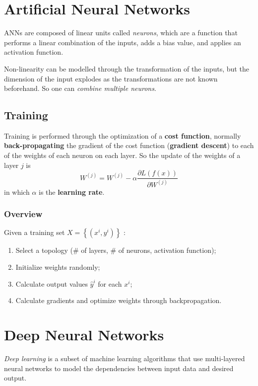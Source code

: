 \documentclass[a4paper]{report}
\begin{document}
\section*{Artificial Neural Networks}

ANNs are composed of linear units called \emph{neurons}, which are a function that performs a linear combination of the inputs, adds a bias value, and applies an activation function.

Non-linearity can be modelled through the transformation of the inputs, but the dimension of the input explodes as the transformations are not known beforehand. So one can \emph{combine multiple neurons}.

\subsection*{Training}

Training is performed through the optimization of a \textbf{cost function}, normally \textbf{back-propagating} the gradient of the cost function (\textbf{gradient descent}) to each of the weights of each neuron on each layer. So the update of the weights of a layer $j$ is \[
    W^{(j)} = W^{(j)} - \alpha \frac{\partial L\left( f(x) \right) }{\partial W^{(j)}} 
\] in which $\alpha$ is the \textbf{learning rate}.

\subsubsection*{Overview}

Given a training set $X = \left\{ \left(x^{i}, y^{i}\right)\right\} $ :
\begin{enumerate}
    \item Select a topology (\# of layers, \# of neurons, activation function);
    \item Initialize weights randomly;
    \item Calculate output values $\hat{y}^{i}$ for each $x^{i}$;
    \item Calculate gradients and optimize weights through backpropagation.
\end{enumerate}

\section*{Deep Neural Networks}

\begin{definition}
    \emph{Deep learning} is a subset of machine learning algorithms that use multi-layered neural networks to model the dependencies between input data and desired output.
\end{definition}
\end{document}
